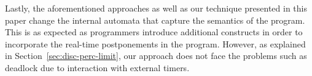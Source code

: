 Lastly, the aforementioned approaches \cite{rsh94,Bourke2009a,glog02} as
well as our technique presented in this paper cha\-nge the internal
automata that capture the semantics of the program. This is as expected
as programmers introduce additional constructs in order to incorporate
the real-time postponements in the program. However, as explained in
Section~\ref{sec:disc-perc-limit}, our approach does not face the
problems such as deadlock due to interaction with external timers.













